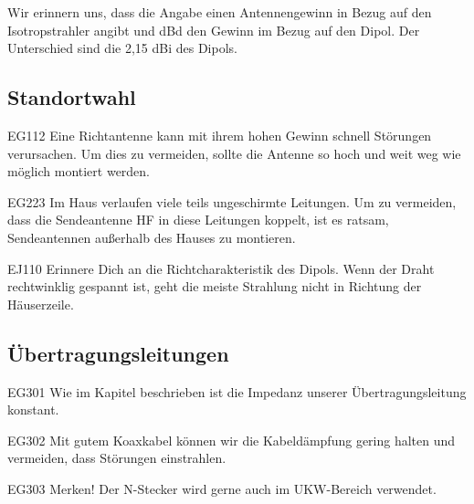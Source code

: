 \begin{ohmchapter}
    Wir erinnern uns, dass die Angabe \unit{\dBi} einen Antennengewinn in Bezug auf den Isotropstrahler angibt und dBd den Gewinn im Bezug auf den Dipol. Der Unterschied sind die 2,15 dBi des Dipols.
\end{ohmchapter}


\subsection{Standortwahl}

\begin{sol}{EG112}
Eine Richtantenne kann mit ihrem hohen Gewinn schnell Störungen verursachen. Um dies zu vermeiden, sollte die Antenne so hoch und weit weg wie möglich montiert werden.
\end{sol}

\begin{sol}{EG223}
Im Haus verlaufen viele teils ungeschirmte Leitungen. Um zu vermeiden, dass die Sendeantenne HF in diese Leitungen koppelt, ist es ratsam, Sendeantennen außerhalb des Hauses zu montieren.
\end{sol}

\begin{sol}{EJ110}
Erinnere Dich an die Richtcharakteristik des Dipols. Wenn der Draht rechtwinklig gespannt ist, geht die meiste Strahlung nicht in Richtung der Häuserzeile.
\end{sol}

\begin{ohmchapter}
\end{ohmchapter}

\subsection{Übertragungsleitungen}

\begin{sol}{EG301}
  Wie im Kapitel beschrieben ist die Impedanz unserer Übertragungsleitung konstant.
\end{sol}

\begin{sol}{EG302}
 Mit gutem Koaxkabel können wir die Kabeldämpfung gering halten und vermeiden, dass Störungen einstrahlen. 
\end{sol}


\begin{sol}{EG303}
Merken! Der N-Stecker wird gerne auch im UKW-Bereich verwendet.
\end{sol}

